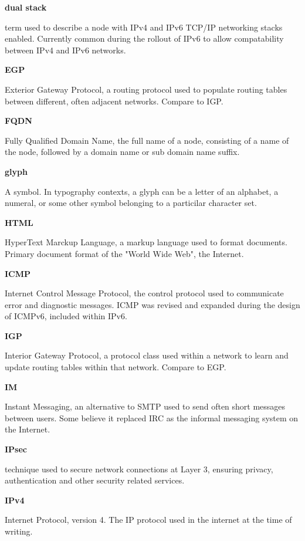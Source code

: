 \textbf{dual stack}

term used to describe a node with IPv4 and IPv6 TCP/IP networking stacks
enabled. Currently common during the rollout of IPv6 to allow
compatability between IPv4 and IPv6 networks.

\textbf{EGP}

Exterior Gateway Protocol, a routing protocol used to populate routing
tables between different, often adjacent networks. Compare to IGP.

\textbf{FQDN}

Fully Qualified Domain Name, the full name of a node, consisting of a
name of the node, followed by a domain name or sub domain name suffix.

\textbf{glyph}

A symbol. In typography contexts, a glyph can be a letter of an
alphabet, a numeral, or some other symbol belonging to a particilar
character set.

\textbf{HTML}

HyperText Marckup Language, a markup language used to format documents.
Primary document format of the "World Wide Web", the Internet.

\textbf{ICMP}

Internet Control Message Protocol, the control protocol used to
communicate error and diagnostic messages. ICMP was revised and expanded 
during the design of ICMPv6, included within IPv6.

\textbf{IGP}

Interior Gateway Protocol, a protocol class used within a network to
learn and update routing tables within that network. Compare to EGP.

\textbf{IM}

Instant Messaging, an alternative to SMTP used to send often short
messages between users. Some believe it replaced IRC as the informal
messaging system on the Internet. 

\textbf{IPsec}

technique used to secure network connections at Layer 3, ensuring
privacy, authentication and other security related services. 

\textbf{IPv4}

Internet Protocol, version 4. The IP protocol used in the internet
at the time of writing.

